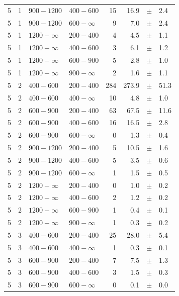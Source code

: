 \begin{table}[!h]
\begin{tabular}{rrllrrcl}
		5 & 1 & $ 900-1200$ & $400-600$ &     15 &     16.9 &$\pm$&    2.4 \\
		5 & 1 & $ 900-1200$ & $600-\infty$ &      9 &      7.0 &$\pm$&    2.4 \\
		5\T & 1 & $1200- \infty$ & $200-400$ &      4 &      4.5 &$\pm$&    1.1 
		\\
		5 & 1 & $1200- \infty$ & $400-600$ &      3 &      6.1 &$\pm$&    1.2 \\
		5 & 1 & $1200- \infty$ & $600-900$ &      5 &      2.8 &$\pm$&    1.0 \\
		5 & 1 & $1200- \infty$ & $900-\infty$ &      2 &      1.6 &$\pm$&    
		1.1 \\
		5\T & 2 & $ 400- 600$ & $200-400$ &    284 &    273.9 &$\pm$&   51.3 \\
		5 & 2 & $ 400- 600$ & $400-\infty$ &     10 &      4.8 &$\pm$&    1.0 \\
		5\T & 2 & $ 600- 900$ & $200-400$ &     63 &     67.5 &$\pm$&   11.6 \\
		5 & 2 & $ 600- 900$ & $400-600$ &     16 &     16.5 &$\pm$&    2.8 \\
		5 & 2 & $ 600- 900$ & $600-\infty$ &      0 &      1.3 &$\pm$&    0.4 \\
		5\T & 2 & $ 900-1200$ & $200-400$ &      5 &     10.5 &$\pm$&    1.6 \\
		5 & 2 & $ 900-1200$ & $400-600$ &      5 &      3.5 &$\pm$&    0.6 \\
		5 & 2 & $ 900-1200$ & $600-\infty$ &      1 &      1.5 &$\pm$&    0.5 \\
		5\T & 2 & $1200- \infty$ & $200-400$ &      0 &      1.0 &$\pm$&    0.2 
		\\
		5 & 2 & $1200- \infty$ & $400-600$ &      2 &      1.2 &$\pm$&    0.2 \\
		5 & 2 & $1200- \infty$ & $600-900$ &      1 &      0.4 &$\pm$&    0.1 \\
		5 & 2 & $1200- \infty$ & $900-\infty$ &      1 &      0.3 &$\pm$&    
		0.2 \\
		5\T & 3 & $ 400- 600$ & $200-400$ &     25 &     28.0 &$\pm$&    5.4 \\
		5 & 3 & $ 400- 600$ & $400-\infty$ &      1 &      0.3 &$\pm$&    0.1 \\
		5\T & 3 & $ 600- 900$ & $200-400$ &      7 &      7.5 &$\pm$&    1.3 \\
		5 & 3 & $ 600- 900$ & $400-600$ &      3 &      1.5 &$\pm$&    0.3 \\
		5 & 3 & $ 600- 900$ & $600-\infty$ &      0 &      0.1 &$\pm$&    0.0 \\

\end{tabular}
\end{table}

